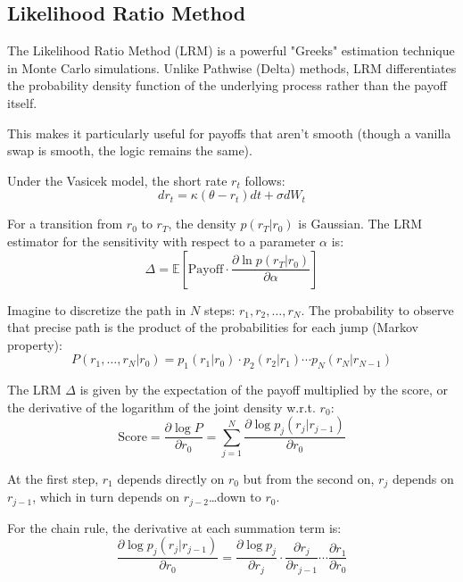 \subsection{Likelihood Ratio Method}
The Likelihood Ratio Method (LRM) is a powerful "Greeks" estimation technique in Monte Carlo simulations. Unlike Pathwise (Delta) methods, LRM differentiates the probability density function of the underlying process rather than the payoff itself.

This makes it particularly useful for payoffs that aren't smooth (though a vanilla swap is smooth, the logic remains the same).

Under the Vasicek model, the short rate $r_t$ follows:
\begin{equation}
dr_t=\kappa (\theta - r_t)dt+\sigma dW_t
\end{equation}

For a transition from $r_0$ to $r_T$, the density $p(r_T|r_0)$ is Gaussian. The LRM estimator for the sensitivity with respect to a parameter $\alpha$ is:
\begin{equation}
\Delta=\mathbb{E}\left[\text{Payoff}\cdot\frac{\partial\ln p(r_T|r_0)}{\partial\alpha}\right]
\end{equation}

Imagine to discretize the path in $N$ steps: $r_1, r_2,\ldots,r_N$.
The probability to observe that precise path is the product of the probabilities for each jump (Markov property):
\begin{equation}
P(r_1,\ldots,r_N|r_0)=p_1(r_1|r_0)\cdot p_2(r_2|r_1)\cdots p_N(r_N|r_{N-1})
\end{equation}

The LRM $\Delta$ is given by the expectation of the payoff multiplied by the score, or the derivative of the logarithm of the joint density w.r.t. $r_0$:
\begin{equation}
\text{Score}=\frac{\partial\log P}{\partial r_0}=\sum_{j=1}^N \frac{\partial\log p_j(r_j|r_{j-1})}{\partial r_0}
\end{equation}

At the first step, $r_1$ depends directly on $r_0$ but from the second on, $r_j$ depends on $r_{j-1}$, which in turn depends on $r_{j-2}$\ldots down to $r_0$.

For the chain rule, the derivative at each summation term is:
\begin{equation}
\frac{\partial\log p_j(r_j|r_{j-1})}{\partial r_0}=\frac{\partial\log p_j}{\partial r_j}\cdot \frac{\partial r_{j}}{\partial r_{j-1}}\cdots\frac{\partial r_1}{\partial r_0}
\end{equation}

